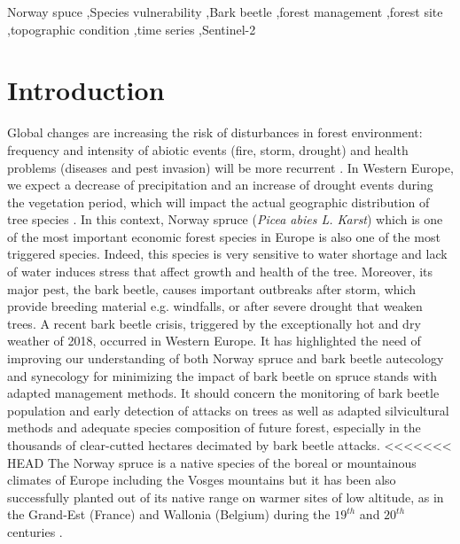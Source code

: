 \documentclass[3p,procedia]{elsarticle}
\begin{document}
\begin{frontmatter}
\begin{abstract}
\fi
\end{abstract}

\begin{keyword}
  Norway spuce \sep Species vulnerability \sep Bark beetle \sep forest management \sep forest site \sep topographic condition \sep time series \sep Sentinel-2
\end{keyword}

\end{frontmatter}

\linenumbers

\section{Introduction}

Global changes are increasing the risk of disturbances in forest environment: frequency and intensity of abiotic events (fire, storm, drought) and health problems (diseases and pest invasion) will be more recurrent \citep{lindner_climate_2010}.
In Western Europe, we expect a decrease of precipitation and an increase of drought events during the vegetation period, which will impact the actual geographic distribution of tree species \citep{hanewinkel2013climate}.
In this context, Norway spruce (\textit{Picea abies L. Karst}) which is one of the most important economic forest species in Europe \citep{nystedt_norway_2013} is also one of the most triggered species.
Indeed, this species is very sensitive to water shortage  \citep{tjoelker_outline_2007} and lack of water induces stress that affect growth and health of the tree.
Moreover, its major pest, the bark beetle, causes important outbreaks after storm, which provide breeding material e.g. windfalls, or after severe drought that weaken trees.
A recent bark beetle crisis, triggered by the exceptionally hot and dry weather of 2018, occurred in Western Europe. 
It has highlighted the need of improving our understanding of both Norway spruce and bark beetle autecology and synecology for minimizing the impact of bark beetle on spruce stands with adapted management methods.
It should concern the monitoring of bark beetle population and early detection of attacks on trees as well as adapted silvicultural methods and adequate species composition of future forest, especially in the thousands of clear-cutted hectares decimated by bark beetle attacks. 
<<<<<<< HEAD
The Norway spruce is a native species of the boreal or mountainous climates of Europe including the Vosges mountains but it has been also successfully planted out of its native range on warmer sites of low altitude, as in the Grand-Est (France) and Wallonia (Belgium) during the $19^{th}$ and $20^{th}$ centuries \citep{Noirfalise_1975,guinier_trois_1959}.
\end{document}
